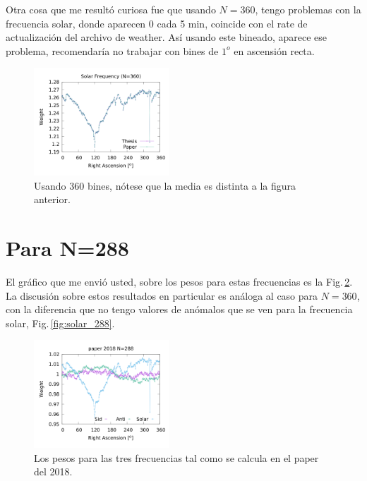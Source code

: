 Otra cosa que me resultó curiosa fue que usando $N=360$, tengo problemas con la frecuencia solar, donde aparecen 0 cada 5 min, coincide con el rate de actualización del archivo de weather. Así usando este bineado, aparece ese problema, recomendaría no trabajar con bines de $1^o$ en ascensión recta.
\begin{figure}[H]
	\centering
	\includegraphics[width=0.45\textwidth]{Graficos/solar_my_and_paper_in_360_2.png}
	\caption{Usando 360 bines, nótese que la media es distinta a la figura anterior.}
	\label{fig:solar_360}
\end{figure}

\section{Para N=288}

El gráfico que me envió usted, sobre los pesos para estas frecuencias es la Fig.\,\ref{fig:all_288_paper}. La discusión sobre estos resultados en particular es análoga al caso para $N=360$, con la diferencia que no tengo valores de anómalos que se ven para la frecuencia solar, Fig.\,\ref{fig:solar_288}.
\begin{figure}[H]
	\centering
	\includegraphics[width=0.45\textwidth]{Graficos/solar_anti_sid_paper2018_in_288.png}
	\caption{Los pesos para las tres frecuencias tal como se calcula en el paper del 2018.}
	\label{fig:all_288_paper}
\end{figure}



